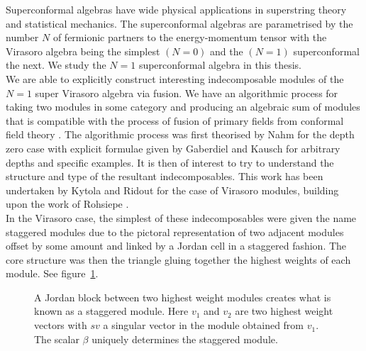 \documentclass[a4paper,reqno,12pt]{report}
\theoremstyle{definition}
\numberwithin{equation}{section}
\theoremstyle{plain}
\begin{document}
Superconformal algebras have wide physical applications in superstring theory and statistical mechanics. The superconformal algebras are parametrised by the number $N$ of fermionic partners to the energy-momentum tensor with the Virasoro algebra being the simplest $(N=0)$ and the $(N=1)$ superconformal the next. We study the $N=1$ superconformal algebra in this thesis.\\

We are able to explicitly construct interesting indecomposable modules of the $N=1$ super Virasoro algebra via fusion. We have an algorithmic process for taking two modules in some category and producing an algebraic sum of modules that is compatible with the process of fusion of primary fields from conformal field theory \cite{GabFus94}. The algorithmic process was first theorised by Nahm \cite{NahQua94} for the depth zero case with explicit formulae given by Gaberdiel and Kausch \cite{GabFus94b,GabInd96} for arbitrary depths and specific examples. It is then of interest to try to understand the structure and type of the resultant indecomposables. This work has been undertaken by Kytola and Ridout \cite{RidSta09} for the case of Virasoro modules, building upon the work of Rohsiepe \cite{RohRed96}.\\

In the Virasoro case, the simplest of these indecomposables were given the name staggered modules due to the pictoral representation of two adjacent modules offset by some amount and linked by a Jordan cell in a staggered fashion. The core structure was then the triangle gluing together the highest weights of each module. See figure~\ref{fig:StagTri}.\\

\begin{figure}
\begin{center}
\end{center}
\caption{A Jordan block between two highest weight modules creates what is known as a staggered module. Here $v_1$ and $v_2$ are two highest weight vectors with $sv$ a singular vector in the module obtained from $v_1$.  The  scalar $\beta$  uniquely determines the staggered module.}\label{fig:StagTri}
\end{figure}
\end{document}
